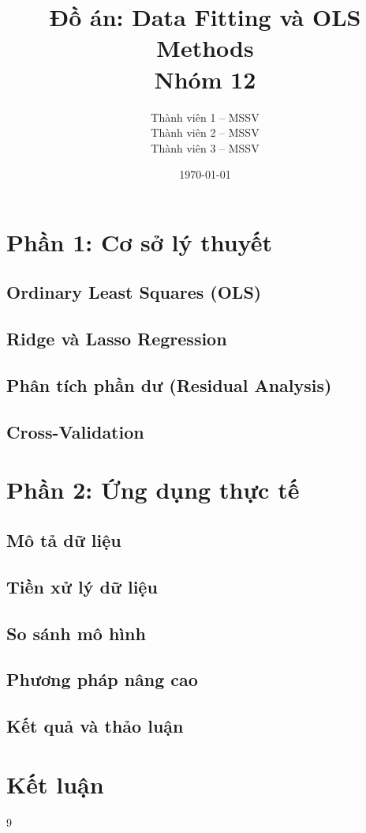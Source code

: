 \documentclass[12pt,a4paper]{article}
\title{
    \textbf{Đồ án: Data Fitting và OLS Methods} \\
    \large Nhóm 12
}
\author{
    Thành viên 1 -- MSSV \\
    Thành viên 2 -- MSSV \\
    Thành viên 3 -- MSSV
}
\date{\today}
\begin{document}
\maketitle
\tableofcontents
\newpage

\section{Phần 1: Cơ sở lý thuyết}

\subsection{Ordinary Least Squares (OLS)}

\subsection{Ridge và Lasso Regression}

\subsection{Phân tích phần dư (Residual Analysis)}

\subsection{Cross-Validation}

\section{Phần 2: Ứng dụng thực tế}

\subsection{Mô tả dữ liệu}

\subsection{Tiền xử lý dữ liệu}

\subsection{So sánh mô hình}

\subsection{Phương pháp nâng cao}

\subsection{Kết quả và thảo luận}

\section{Kết luận}

\begin{thebibliography}{9}
\end{thebibliography}
\end{document}
